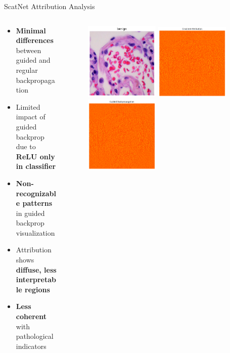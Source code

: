 \documentclass[aspectratio=169,8pt]{beamer}  %
\begin{document}
\begin{frame}{ScatNet Attribution Analysis}
\begin{columns}[T]
\begin{column}{0.5\textwidth}
\begin{itemize}
\item \textbf{Minimal differences} between guided and regular backpropagation
\item Limited impact of guided backprop due to \textbf{ReLU only in classifier}
\item \textbf{Non-recognizable patterns} in guided backprop visualization
\item Attribution shows \textbf{diffuse, less interpretable regions}
\item \textbf{Less coherent} with pathological indicators
\end{itemize}
\end{column}
\begin{column}{0.5\textwidth}
\begin{figure}
\includegraphics[width=0.45\textwidth]{imgs/normal_image.png}
\vspace{0.2cm}
\includegraphics[width=0.45\textwidth]{imgs/scatnet_bp.png}
\vspace{0.2cm}
\includegraphics[width=0.45\textwidth]{imgs/scatnet_gbp.png}

\end{figure}
\end{column}
\end{columns}
\end{frame}
\end{document}
